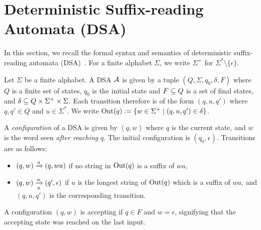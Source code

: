 \newcommand{\lt}{\ell}
\newcommand{\rt}{r}

\section{Deterministic Suffix-reading Automata (DSA)}
\label{sec:prelims}

In this section, we recall the formal syntax and semantics of deterministic suffix-reading automata (DSA)~\cite{DBLP:journals/corr/abs-2410-22761}. For a finite alphabet $\Sigma$, we write $\Sigma^+$ for $\Sigma^* \setminus \{\epsilon\}$. %

\begin{definition}
Let $\Sigma$ be a finite alphabet. A DSA $\mathcal{A}$ is given by a tuple $(Q, \Sigma, q_0, \delta, F)$ where $Q$ is a finite set of states, $q_0$ is the initial state and $F \subseteq Q$ is a set of final states, and $\delta \subseteq Q \times \Sigma^+ \times \Sigma$. Each transition therefore is of the form $(q, u, q')$ where $q, q' \in Q$ and $u \in \Sigma^*$. We write $\operatorname{Out}(q) := \{ w \in \Sigma^+ \mid (q, u, q') \in \delta \}$.
\end{definition}

A \emph{configuration} of a DSA is given by $(q, w)$ where $q$ is the current state, and $w$ is the word seen \emph{after reaching} $q$. The initial configuration is $(q_0, \epsilon)$. Transitions are as follows:
\begin{itemize}
\item $(q, w) \xrightarrow{a} (q, wa)$ if no string in $\operatorname{Out}(q)$ is a suffix of $wa$,
\item $(q, w) \xrightarrow[u]{a} (q', \epsilon)$ if $u$ is the longest string of $\operatorname{Out}(q)$ which is a suffix of $wa$, and $(q, u, q')$ is the corresponding transition. 
\end{itemize}
A configuration $(q, w)$ is accepting if $q \in F$ and $w = \epsilon$, signifying that the accepting state was reached on the last input.


